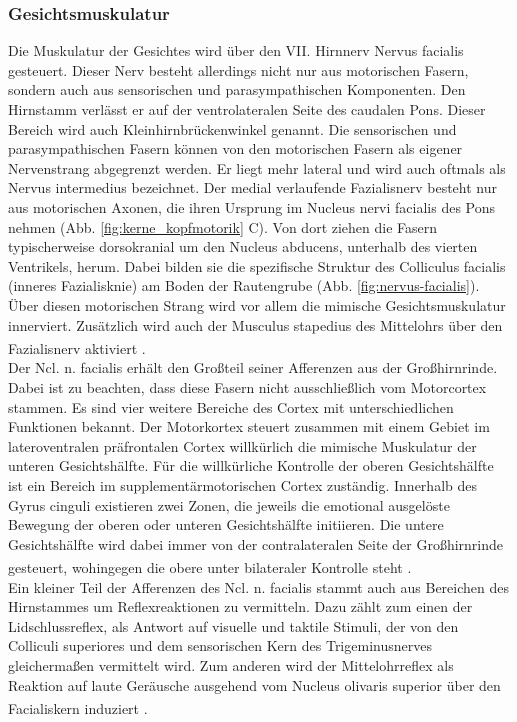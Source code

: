 \documentclass[12pt,a4paper,pdftex]{article}
\begin{document}
\subsubsection*{Gesichtsmuskulatur}
Die Muskulatur der Gesichtes wird über den VII. Hirnnerv Nervus facialis  gesteuert. Dieser Nerv besteht allerdings nicht nur aus motorischen Fasern, sondern auch aus sensorischen und parasympathischen Komponenten. Den Hirnstamm verlässt er auf der ventrolateralen Seite des caudalen Pons. Dieser Bereich wird auch Kleinhirnbrückenwinkel genannt. Die sensorischen und parasympathischen Fasern können von den motorischen Fasern als eigener Nervenstrang abgegrenzt werden. Er liegt mehr lateral und wird auch oftmals als Nervus intermedius bezeichnet. Der medial verlaufende Fazialisnerv besteht nur aus motorischen Axonen, die ihren Ursprung im Nucleus nervi facialis  des Pons nehmen (Abb. \ref{fig:kerne_kopfmotorik} C). Von dort ziehen die Fasern typischerweise dorsokranial um den Nucleus abducens, unterhalb des vierten Ventrikels, herum. Dabei bilden sie die spezifische Struktur des Colliculus facialis (inneres Fazialisknie) am Boden der Rautengrube (Abb. \ref{fig:nervus-facialis}). Über diesen motorischen Strang wird vor allem die mimische Gesichtsmuskulatur innerviert. Zusätzlich wird auch der Musculus stapedius des Mittelohrs über den Fazialisnerv aktiviert \textsuperscript{\cite[10][5]{crossman2014neuroanatomy, trepel2011neuroanatomie}}. \\
Der Ncl. n. facialis erhält den Großteil seiner Afferenzen aus der Großhirnrinde. Dabei ist zu beachten, dass diese Fasern nicht ausschließlich vom Motorcortex stammen. Es sind vier weitere Bereiche des Cortex mit unterschiedlichen Funktionen bekannt. Der Motorkortex steuert zusammen mit einem Gebiet im lateroventralen präfrontalen Cortex willkürlich die mimische Muskulatur der unteren Gesichtshälfte. Für die willkürliche Kontrolle der oberen Gesichtshälfte ist ein Bereich im supplementärmotorischen Cortex zuständig. Innerhalb des Gyrus cinguli existieren zwei Zonen, die jeweils die emotional ausgelöste Bewegung der oberen oder unteren Gesichtshälfte initiieren. Die untere Gesichtshälfte wird dabei immer von der contralateralen Seite der Großhirnrinde gesteuert, wohingegen die obere unter bilateraler Kontrolle steht \textsuperscript{\cite[9]{trepel2011neuroanatomie}}. \\
Ein kleiner Teil der Afferenzen des Ncl. n. facialis stammt auch aus Bereichen des Hirnstammes um Reflexreaktionen zu vermitteln. Dazu zählt zum einen der Lidschlussreflex, als Antwort auf visuelle und taktile Stimuli, der von den Colliculi superiores und dem sensorischen Kern des Trigeminusnerves gleichermaßen vermittelt wird. Zum anderen wird der Mittelohrreflex als Reaktion auf laute Geräusche ausgehend vom Nucleus olivaris superior über den Facialiskern induziert \textsuperscript{\cite[10]{crossman2014neuroanatomy}}. \\
\end{document}
